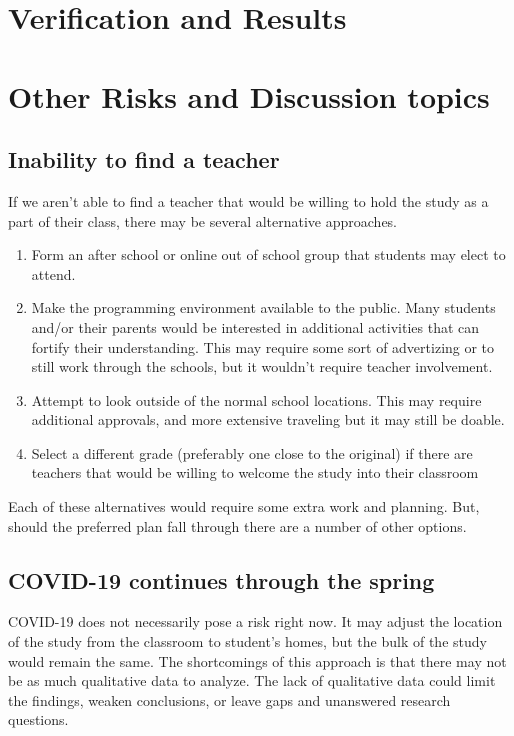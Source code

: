 \section*{Verification and Results}


\section*{Other Risks and Discussion topics}
\subsection*{Inability to find a teacher}
If we aren't able to find a teacher that would be willing to hold the study as a part of their class, there may be several alternative approaches.

\begin{enumerate}
	\item Form an after school or online out of school group that students may elect to attend.
	\item Make the programming environment available to the public. Many students and/or their parents would be interested in additional activities that can fortify their understanding. This may require some sort of advertizing or to still work through the schools, but it wouldn't require teacher involvement.
	\item Attempt to look outside of the normal school locations. This may require additional approvals, and more extensive traveling but it may still be doable.
	\item Select a different grade (preferably one close to the original) if there are teachers that would be willing to welcome the study into their classroom
\end{enumerate}
Each of these alternatives would require some extra work and planning. But, should the preferred plan fall through there are a number of other options. 

\subsection*{COVID-19 continues through the spring}
COVID-19 does not necessarily pose a risk right now. It may adjust the location of the study from the classroom to student's homes, but the bulk of the study would remain the same. The shortcomings of this approach is that there may not be as much qualitative data to analyze. The lack of qualitative data could limit the findings, weaken conclusions, or leave gaps and unanswered research questions.


